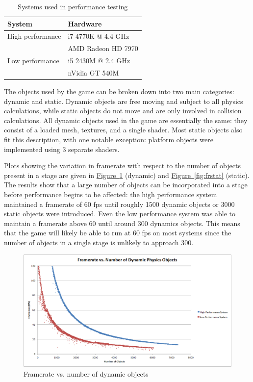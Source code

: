 \documentclass[12pt, titlepage]{article}
\begin{document}
\begin{table}[ht]
\caption{Systems used in performance testing} \label{tab:systems}
\begin{tabularx}{\textwidth}{p{5cm}X}
\toprule {\bf System} & {\bf Hardware}\\
\midrule
High performance & i7 4770K @ 4.4 GHz\\
& AMD Radeon HD 7970\\[10pt]
Low performance & i5 2430M @ 2.4 GHz\\
& nVidia GT 540M\\
\bottomrule
\end{tabularx}
\end{table}

The objects used by the game can be broken down into two main categories:  dynamic and static.  Dynamic objects are free moving and subject to all physics calculations, while static objects do not move and are only involved in collision calculations.  All dynamic objects used in the game are essentially the same: they consist of a loaded mesh, textures, and a single shader.  Most static objects also fit this description, with one notable exception:  platform objects were implemented using 3 separate shaders.

Plots showing the variation in framerate with respect to the number of objects present in a stage are given in \hyperref[fig:frdynamic]{Figure~\ref*{fig:frdynamic}} (dynamic) and \hyperref[fig:frstat]{Figure~\ref*{fig:frstat}} (static).  The results show that a large number of objects can be incorporated into a stage before performance begins to be affected:  the high performance system maintained a framerate of 60 fps until roughly 1500 dynamic objects or 3000 static objects were introduced.  Even the low performance system was able to maintain a framerate above 60 until around 300 dynamics objects.  This means that the game will likely be able to run at 60 fps on most systems since the number of objects in a single stage is unlikely to approach 300.

\begin{figure}[htb]
\centering
\includegraphics[width=\textwidth]{frameratedynamic}
\caption{Framerate vs. number of dynamic objects} \label{fig:frdynamic}
\end{figure}
\end{document}
